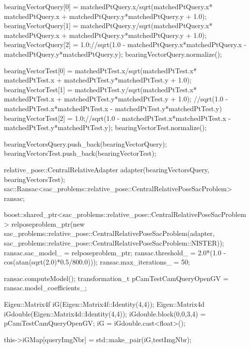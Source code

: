 \begin{DoxyCode}
{{                bearingVectorQuery[0] = matchedPtQuery.x/sqrt(matchedPtQuery.x*
      matchedPtQuery.x + matchedPtQuery.y*matchedPtQuery.y + 1.0);
                bearingVectorQuery[1] = matchedPtQuery.y/sqrt(matchedPtQuery.x*
      matchedPtQuery.x + matchedPtQuery.y*matchedPtQuery.y + 1.0);
                bearingVectorQuery[2] = 1.0;//sqrt(1.0 -
       matchedPtQuery.x*matchedPtQuery.x - matchedPtQuery.y*matchedPtQuery.y);
                bearingVectorQuery.normalize();

                bearingVectorTest[0] = matchedPtTest.x/sqrt(matchedPtTest.x*
      matchedPtTest.x + matchedPtTest.y*matchedPtTest.y + 1.0);
                bearingVectorTest[1] = matchedPtTest.y/sqrt(matchedPtTest.x*
      matchedPtTest.x + matchedPtTest.y*matchedPtTest.y + 1.0);
                //sqrt(1.0 - matchedPtTest.x*matchedPtTest.x -
       matchedPtTest.y*matchedPtTest.y)
                bearingVectorTest[2] = 1.0;//sqrt(1.0 -
       matchedPtTest.x*matchedPtTest.x - matchedPtTest.y*matchedPtTest.y);
                bearingVectorTest.normalize();

                bearingVectorsQuery.push_back(bearingVectorQuery);
                bearingVectorsTest.push_back(bearingVectorTest);

        }

        relative_pose::CentralRelativeAdapter adapter(bearingVectorsQuery,
      bearingVectorsTest);
        sac::Ransac<sac_problems::relative_pose::CentralRelativePoseSacProblem>
       ransac;
        
      boost::shared_ptr<sac_problems::relative_pose::CentralRelativePoseSacProblem> relposeproblem_ptr(new 
      sac_problems::relative_pose::CentralRelativePoseSacProblem(adapter,
      sac_problems::relative_pose::CentralRelativePoseSacProblem::NISTER));
        ransac.sac_model_ = relposeproblem_ptr;
        ransac.threshold_ = 2.0*(1.0 - cos(atan(sqrt(2.0)*0.5/800.0)));
        ransac.max_iterations_ = 50;

        ransac.computeModel();
        transformation_t pCamTestCamQueryOpenGV = ransac.model_coefficients_;


        Eigen::Matrix4f iG(Eigen::Matrix4f::Identity(4,4));
        Eigen::Matrix4d iGdouble(Eigen::Matrix4d::Identity(4,4));
        iGdouble.block(0,0,3,4) = pCamTestCamQueryOpenGV;
        iG = iGdouble.cast<float>();

        this->iGMap[queryImgNbr] = std::make_pair(iG,testImgNbr);

}
\end{DoxyCode}

